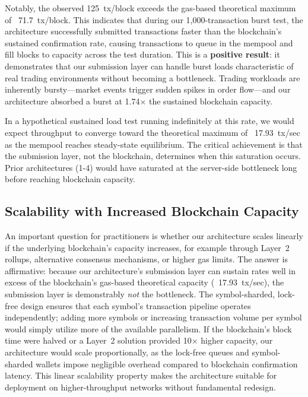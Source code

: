 Notably, the observed 125~tx/block exceeds the gas-based theoretical maximum of ~71.7~tx/block. This indicates that during our 1,000-transaction burst test, the architecture successfully submitted transactions faster than the blockchain's sustained confirmation rate, causing transactions to queue in the mempool and fill blocks to capacity across the test duration. This is a \textbf{positive result}: it demonstrates that our submission layer can handle burst loads characteristic of real trading environments without becoming a bottleneck. Trading workloads are inherently bursty—market events trigger sudden spikes in order flow—and our architecture absorbed a burst at 1.74$\times$ the sustained blockchain capacity.

In a hypothetical sustained load test running indefinitely at this rate, we would expect throughput to converge toward the theoretical maximum of ~17.93~tx/sec as the mempool reaches steady-state equilibrium. The critical achievement is that the submission layer, not the blockchain, determines when this saturation occurs. Prior architectures (1-4) would have saturated at the server-side bottleneck long before reaching blockchain capacity.

\subsection{Scalability with Increased Blockchain Capacity}

An important question for practitioners is whether our architecture scales linearly if the underlying blockchain's capacity increases, for example through Layer~2 rollups, alternative consensus mechanisms, or higher gas limits. The answer is affirmative: because our architecture's submission layer can sustain rates well in excess of the blockchain's gas-based theoretical capacity (~17.93~tx/sec), the submission layer is demonstrably \textit{not} the bottleneck. The symbol-sharded, lock-free design ensures that each symbol's transaction pipeline operates independently; adding more symbols or increasing transaction volume per symbol would simply utilize more of the available parallelism. If the blockchain's block time were halved or a Layer~2 solution provided 10$\times$ higher capacity, our architecture would scale proportionally, as the lock-free queues and symbol-sharded wallets impose negligible overhead compared to blockchain confirmation latency. This linear scalability property makes the architecture suitable for deployment on higher-throughput networks without fundamental redesign.

